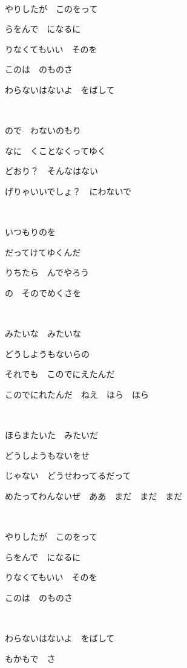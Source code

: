 ~

やりしたが　このをって

らをんで　になるに

りなくてもいい　そのを

このは　のものさ

わらないはないよ　をばして

~

ので　わないのもり

なに　くことなくってゆく

どおり？　そんなはない

げりゃいいでしょ？　にわないで

~

いつもりのを

だってけてゆくんだ

りちたら　んでやろう

の　そのでめくさを

~

みたいな　みたいな

どうしようもないらの

それでも　このでにえたんだ

このでにれたんだ　ねえ　ほら　ほら

~

ほらまたいた　みたいだ

どうしようもないをせ

じゃない　どうせわってるだって

めたってわんないぜ　ああ　まだ　まだ　まだ

~

やりしたが　このをって

らをんで　になるに

りなくてもいい　そのを

このは　のものさ

~

わらないはないよ　をばして

もかもで　さ
